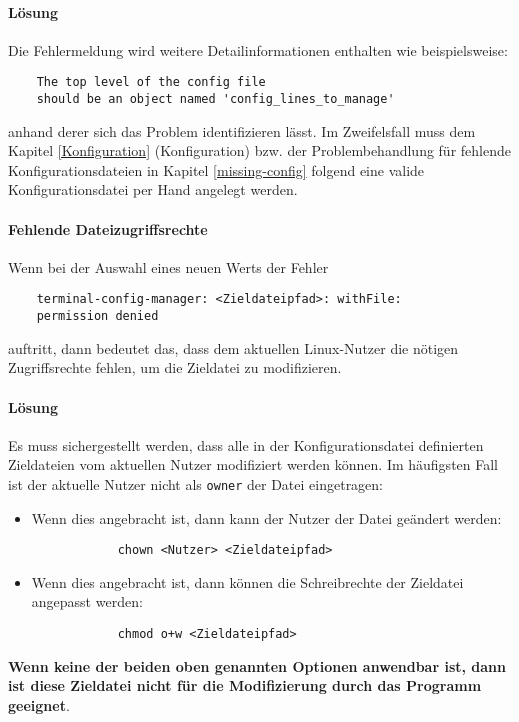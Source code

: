 \paragraph{Lösung}
Die Fehlermeldung wird weitere Detailinformationen enthalten wie beispielsweise:

\begin{verbatim}
    The top level of the config file
    should be an object named 'config_lines_to_manage'
\end{verbatim}

anhand derer sich das Problem identifizieren lässt. Im Zweifelsfall muss dem
Kapitel \ref{Konfiguration} (Konfiguration) bzw. der Problembehandlung für
fehlende Konfigurationsdateien in Kapitel \ref{missing-config} folgend eine valide Konfigurationsdatei
per Hand angelegt werden.

\paragraph{Fehlende Dateizugriffsrechte} Wenn bei der Auswahl eines neuen Werts
der Fehler

\begin{verbatim}
    terminal-config-manager: <Zieldateipfad>: withFile:
    permission denied
\end{verbatim}

auftritt, dann bedeutet das, dass dem aktuellen Linux-Nutzer die nötigen
Zugriffsrechte fehlen, um die Zieldatei zu modifizieren.

\paragraph{Lösung}
Es muss sichergestellt werden, dass alle in der Konfigurationsdatei definierten
Zieldateien vom aktuellen Nutzer modifiziert werden können. Im häufigsten Fall
ist der aktuelle Nutzer nicht als \texttt{owner} der Datei eingetragen:

\begin{itemize}
    \item Wenn dies angebracht ist, dann kann der Nutzer der Datei geändert werden:
          \begin{verbatim}
            chown <Nutzer> <Zieldateipfad>
        \end{verbatim}
    \item Wenn dies angebracht ist, dann können die Schreibrechte der Zieldatei
          angepasst werden:
          \begin{verbatim}
            chmod o+w <Zieldateipfad>
        \end{verbatim}
\end{itemize}

\textbf{Wenn keine der beiden oben genannten Optionen anwendbar ist, dann ist diese
    Zieldatei nicht für die Modifizierung durch das Programm geeignet}.